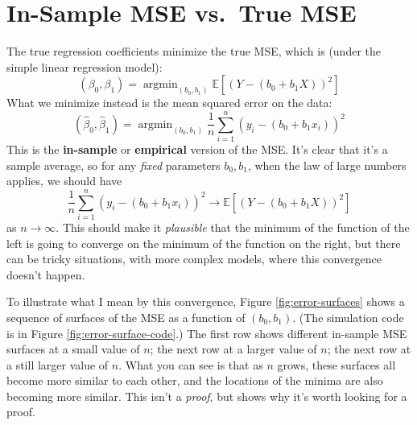 \documentclass{article}
\newcommand{\Expect}[1]{\mathbb{E}\left[ #1 \right]}
\DeclareMathOperator*{\argmin}{argmin}
\begin{document}
\section{In-Sample MSE vs.\ True MSE}

The true regression coefficients minimize the true MSE, which is (under
the simple linear regression model):
\begin{equation}
(\beta_0, \beta_1) = \argmin_{(b_0, b_1)} {\Expect{(Y- (b_0 + b_1 X))^2}}
\end{equation}
What we minimize instead is the mean squared error on the data:
\begin{equation}
(\hat{\beta}_0, \hat{\beta}_1) = \argmin_{(b_0, b_1)}{\frac{1}{n}\sum_{i=1}^{n}{(y_i - (b_0 + b_1 x_i))^2}}
\end{equation}
This is the {\bf in-sample} or {\bf empirical} version of the MSE.  It's clear
that it's a sample average, so for any {\em fixed} parameters $b_0, b_1$, when
the law of large numbers applies, we should have
\begin{equation}
\frac{1}{n}\sum_{i=1}^{n}{(y_i - (b_0 + b_1 x_i))^2} \rightarrow \Expect{(Y- (b_0 + b_1 X))^2}
\end{equation}
as $n \rightarrow \infty$.  This should make it {\em plausible} that the
minimum of the function of the left is going to converge on the minimum of the
function on the right, but there can be tricky situations, with more complex
models, where this convergence doesn't happen.

To illustrate what I mean by this convergence, Figure \ref{fig:error-surfaces}
shows a sequence of surfaces of the MSE as a function of $(b_0, b_1)$.  (The
simulation code is in Figure \ref{fig:error-surface-code}.)  The first row
shows different in-sample MSE surfaces at a small value of $n$; the next row at
a larger value of $n$; the next row at a still larger value of $n$.  What you
can see is that as $n$ grows, these surfaces all become more similar to each
other, and the locations of the minima are also becoming more similar.  This
isn't a {\em proof}, but shows why it's worth looking for a proof.
\end{document}
